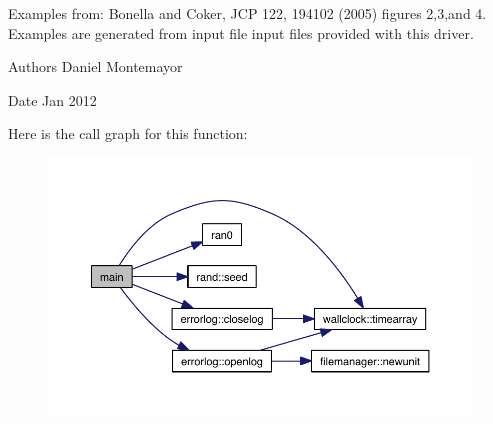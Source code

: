 Examples from\+: Bonella and Coker, J\+CP 122, 194102 (2005) figures 2,3,and 4. Examples are generated from input file input files provided with this driver. \begin{DoxyAuthor}{Authors}
Daniel Montemayor
\end{DoxyAuthor}
\begin{DoxyDate}{Date}
Jan 2012 
\end{DoxyDate}
Here is the call graph for this function\+:\nopagebreak
\begin{figure}[H]
\begin{center}
\leavevmode
\includegraphics[width=350pt]{share_2examples_2_spin_boson_2system__driver_8f90_a8ec2266d83cd6c0b762cbcbc92c0af3d_cgraph}
\end{center}
\end{figure}
